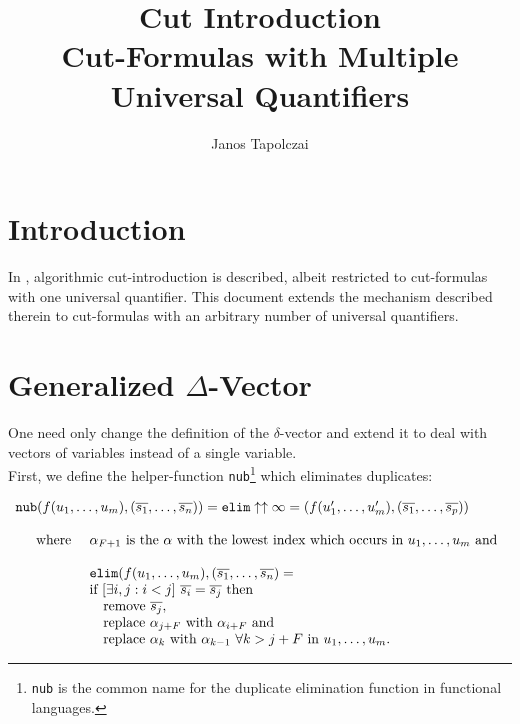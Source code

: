 \documentclass[a4paper, 11pt]{report}
\title{Cut Introduction\\ \vspace{0.5cm} Cut-Formulas with Multiple Universal Quantifiers}
\author{Janos Tapolczai}
\newcommand{\mt}[1]{\textnormal{#1}}
\begin{document}
\maketitle

\section{Introduction}

In \cite[Ch. 5]{cutIntro2013}, algorithmic cut-introduction is described, albeit restricted to cut-formulas with
one universal quantifier. This document extends the mechanism described therein to cut-formulas with an
arbitrary number of universal quantifiers.

\section{Generalized $\Delta$-Vector}

One need only change the definition of the $\delta$-vector and extend it to deal with vectors of variables
instead of a single variable.\\

\noindent
First, we define the helper-function \texttt{nub}\footnote{\texttt{nub} is the common name for the duplicate elimination function in functional languages.} which eliminates duplicates:

$$
  \begin{array}{l}
    \texttt{nub}(f(u_1,\dots,u_m), (\overline{s_1},\dots,\overline{s_n})) = \texttt{elim} \uparrow \uparrow \infty =
    (f(u_1',\dots,u_m'), (\overline{s_1},\dots,\overline{s_p}))\\

    \\

    \quad 
      \begin{array}{l l}
        \mt{where } &
        \alpha_{F+1} \mt{ is the } \alpha \mt{ with the lowest index which occurs in } u_1,\dots,u_m \mt{ and}\\

        \\

        & \texttt{elim}(f(u_1,\dots,u_m), (\overline{s_1},\dots,\overline{s_n}) =\\
        & \mt{if } [\exists i,j: i < j]\ \overline{s_{i}} = \overline{s_{j}} \mt { then}\\
        & \quad \mt{remove } \overline{s_{j}},\\
        & \quad \mt{replace } \alpha_{j+F} \mt { with } \alpha_{i+F} \mt{ and }\\
        & \quad \mt{replace } \alpha_k \mt{ with } \alpha_{k-1}\ \forall k > j+F \mt{ in } u_1,\dots,u_m \mt{.}
        \\
      \end{array}
  \end{array}
$$
\end{document}
